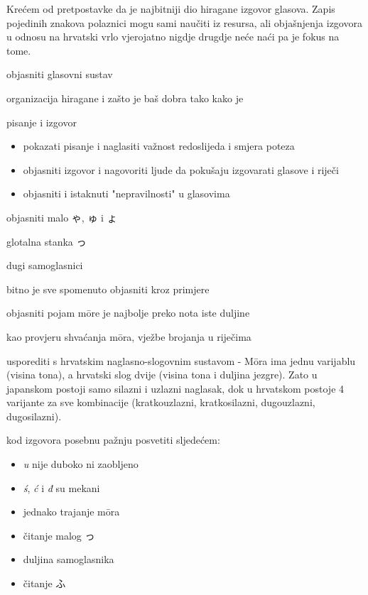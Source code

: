 
\author{autor}

	
	Krećem od pretpostavke da je najbitniji dio hiragane izgovor glasova. Zapis pojedinih znakova polaznici mogu sami naučiti iz resursa, ali objašnjenja izgovora u odnosu na hrvatski vrlo vjerojatno nigdje drugdje neće naći pa je fokus na tome.
	
	
	\begin{hyou}
		\item objasniti glasovni sustav
		\item organizacija hiragane i zašto je baš dobra tako kako je
		\item pisanje i izgovor
		\begin{itemize}
			\itemsep-5pt
			\item pokazati pisanje i naglasiti važnost redoslijeda i smjera poteza
			\item objasniti izgovor i nagovoriti ljude da pokušaju izgovarati glasove i riječi
			\item objasniti i istaknuti "nepravilnosti" u glasovima
		\end{itemize}
		\item objasniti malo ゃ, ゅ i ょ
		\item glotalna stanka っ
		\item dugi samoglasnici
	\end{hyou}

	\fukudai{Napomene}
	
	\begin{hyou}
		\item bitno je sve spomenuto objasniti kroz primjere
		\item objasniti pojam m\={o}re je najbolje preko nota iste duljine
		\item kao provjeru shvaćanja m\={o}ra, vježbe brojanja u riječima
		\item usporediti s hrvatskim naglasno-slogovnim sustavom - M\={o}ra ima jednu varijablu (visina tona), a hrvatski slog dvije (visina tona i duljina jezgre). Zato u japanskom postoji samo silazni i uzlazni naglasak, dok u hrvatskom postoje 4 varijante za sve kombinacije (kratkouzlazni, kratkosilazni, dugouzlazni, dugosilazni).
		\item kod izgovora posebnu pažnju posvetiti sljedećem:
		\begin{itemize}
			\itemsep-5pt
			\item \textit{u} nije duboko ni zaobljeno
			\item \textit{\'{s}}, \textit{ć} i \textit{đ} su mekani
			\item jednako trajanje m\={o}ra
			\item čitanje malog っ
			\item duljina samoglasnika
			\item čitanje ふ
		\end{itemize}
	\end{hyou}


